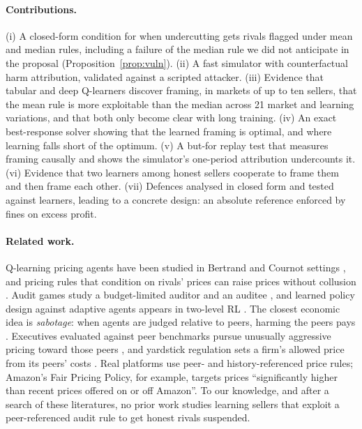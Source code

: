 \documentclass{article}
\begin{document}
\paragraph{Contributions.} (i) A closed-form condition for when undercutting gets rivals flagged under mean and median rules, including a failure of the median rule we did not anticipate in the proposal (Proposition~\ref{prop:vuln}). (ii) A fast simulator with counterfactual harm attribution, validated against a scripted attacker. (iii) Evidence that tabular and deep Q-learners discover framing, in markets of up to ten sellers, that the mean rule is more exploitable than the median across 21 market and learning variations, and that both only become clear with long training. (iv) An exact best-response solver showing that the learned framing is optimal, and where learning falls short of the optimum. (v) A but-for replay test that measures framing causally and shows the simulator's one-period attribution undercounts it. (vi) Evidence that two learners among honest sellers cooperate to frame them and then frame each other. (vii) Defences analysed in closed form and tested against learners, leading to a concrete design: an absolute reference enforced by fines on excess profit.

\paragraph{Related work.} Q-learning pricing agents have been studied in Bertrand and Cournot settings \citep{tesauro2002,waltman2008,calvano2020,klein2021}, and pricing rules that condition on rivals' prices can raise prices without collusion \citep{brown2023}. Audit games study a budget-limited auditor and an auditee \citep{blocki2013}, and learned policy design against adaptive agents appears in two-level RL \citep{zheng2022}. The closest economic idea is \emph{sabotage}: when agents are judged relative to peers, harming the peers pays \citep{lazear1989,chowdhury2015}. Executives evaluated against peer benchmarks pursue unusually aggressive pricing toward those peers \citep{bloomfield2020}, and yardstick regulation sets a firm's allowed price from its peers' costs \citep{shleifer1985}. Real platforms use peer- and history-referenced price rules; Amazon's Fair Pricing Policy, for example, targets prices ``significantly higher than recent prices offered on or off Amazon''. To our knowledge, and after a search of these literatures, no prior work studies learning sellers that exploit a peer-referenced audit rule to get honest rivals suspended.
\end{document}
